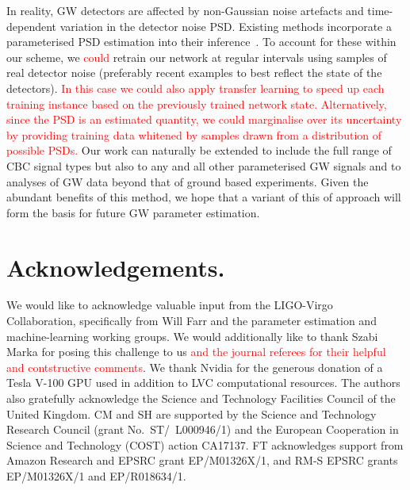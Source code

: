 \documentclass[%
showpacs,
nofootinbib,
 amsmath,amssymb,
 aps,
 twocolumn,
 prl,
 reprint,
floatfix,
]{revtex4-1}
\newcommand{\new}[1]{\textcolor{red}{#1}}
\begin{document}
%
%
In reality, \ac{GW} detectors are affected by non-Gaussian noise artefacts and
time-dependent variation in the detector noise \ac{PSD}. Existing methods
incorporate a parameterised \ac{PSD} estimation into their
inference~\cite{2015PhRvD..91h4034L}. To account for these within our scheme,
we \new{could} retrain our network at regular intervals using samples of real
detector noise (preferably recent examples to best reflect the state of the
detectors). \new{In this case we could also apply transfer learning to speed up
each training instance based on the previously trained network state.
Alternatively, since the \ac{PSD} is an estimated quantity, we could
marginalise over its uncertainty by providing training data whitened by samples
drawn from a distribution of possible \acp{PSD}.} Our work can naturally be
extended to include the full range of \ac{CBC} signal types but also to any and
all other parameterised \ac{GW} signals and to analyses of \ac{GW} data beyond
that of ground based experiments. Given the abundant benefits of this method,
we hope that a variant of this of approach will form the basis for future
\ac{GW} parameter estimation.
%
%

%
%
\section{Acknowledgements.}
%
We would like to acknowledge valuable input from the LIGO-Virgo Collaboration,
specifically from Will Farr and the parameter estimation and machine-learning
working groups. We would additionally like to thank Szabi Marka for posing this
challenge to us \new{and the journal referees for their helpful and contstructive
comments}. We thank Nvidia for the generous donation of a Tesla V-100 GPU
used in addition to \ac{LVC} computational resources. The authors also
gratefully acknowledge the Science and Technology Facilities Council of the
United Kingdom. CM and SH are supported by the Science and Technology Research
Council (grant No.~ST/~L000946/1) and the European Cooperation in Science and
Technology (COST) action CA17137. FT acknowledges support from Amazon Research and 
EPSRC grant EP/M01326X/1, and RM-S EPSRC grants EP/M01326X/1 and EP/R018634/1. 

%
%


\end{document}
